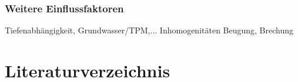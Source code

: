 \documentclass[hyperref={pdfpagemode=FullScreen, colorlinks=false}]{beamer}
\begin{document}
\begin{frame}
\frametitle{Weitere Einflussfaktoren}
Tiefenabhängigkeit, Grundwasser/TPM,...
Inhomogenitäten
Beugung, Brechung
\end{frame}




\section*{Literaturverzeichnis}

\begin{frame}[allowframebreaks]{}
	\printbibliography
\end{frame}
\end{document}
